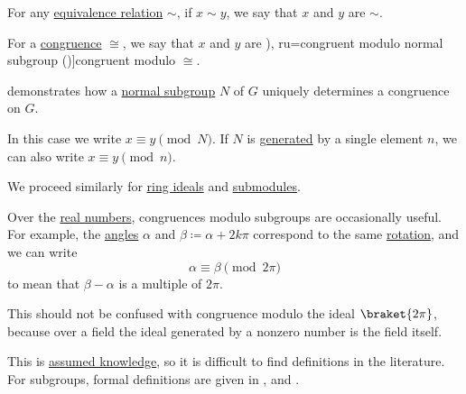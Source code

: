 \begin{definition}\label{def:equivalence_modulo}\mimprovised
  For any \hyperref[def:equivalence_relation]{equivalence relation} \( {\sim} \), if \( x \sim y \), we say that \( x \) and \( y \) are  \( {\sim} \).

  \begin{thmenum}
     For a \hyperref[def:fol_congruence]{congruence} \( {\cong} \), we say that \( x \) and \( y \) are \term[ru=сравнимые по модулю подгруппы (\cite[175]{Винберг2014КурсАлгебры}), ru=congruent modulo normal subgroup (\cite[15]{Lang2002Algebra})]{congruent modulo} \( {\cong} \).

      demonstrates how a \hyperref[def:normal_subgroup]{normal subgroup} \( N \) of \( G \) uniquely determines a congruence on \( G \).

    In this case we write \( x \equiv y \pmod N \). If \( N \) is \hyperref[def:group/generated]{generated} by a single element \( n \), we can also write \( x \equiv y \pmod n \).

    We proceed similarly for \hyperref[def:semiring_ideal]{ring ideals} and \hyperref[def:module/subobject]{submodules}.

     Over the \hyperref[def:real_numbers]{real numbers}, congruences modulo subgroups are occasionally useful. For example, the \hyperref[def:angle]{angles} \( \alpha \) and \( \beta \coloneqq \alpha + 2k\pi \) correspond to the same \hyperref[def:rigid_motion/rotation]{rotation}, and we can write
    \begin{equation*}
      \alpha \equiv \beta \pmod{2\pi}
    \end{equation*}
    to mean that \( \beta - \alpha \) is a multiple of \( 2\pi \).

    This should not be confused with congruence modulo the ideal \( \braket{ 2\pi } \), because over a field the ideal generated by a nonzero number is the field itself.
  \end{thmenum}
\end{definition}
\begin{comments}
  \item This is \hyperref[con:assumed_knowledge]{assumed knowledge}, so it is difficult to find definitions in the literature. For subgroups, formal definitions are given in \cite[35]{Bourbaki1998Algebra1to3}, \cite[15]{Lang2002Algebra} and \cite[175]{Винберг2014КурсАлгебры}.
\end{comments}

